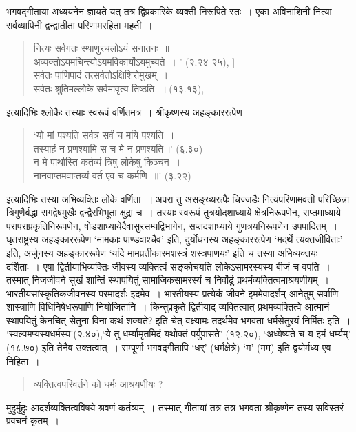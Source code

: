 {भगवद्गीताया अध्ययनेन ज्ञायते यत् तत्र द्विप्रकारिके व्यक्ती निरूपिते स्तः~। एका अविनाशिनी नित्या सर्वव्यापिनी द्वन्द्वातीता परिणामरहिता महती~। 
\begin{verse}
नित्यः सर्वगतः स्थाणुरचलोऽयं सनातनः~॥ \\
अव्यक्तोऽयमचिन्त्योऽयमविकार्योऽयमुच्यते~। ' (२.२४-२५), ]\\
सर्वतः पाणिपादं तत्सर्वतोऽक्षिशिरोमुखम्~। \\
सर्वतः श्रुतिमल्लोके सर्वमावृत्य तिष्ठति~॥ (१३.१३), 
\end{verse}
इत्यादिभिः श्लोकैः तस्याः स्वरूपं वर्णितमत्र~। श्रीकृष्णस्य अहङ्काररूपेण 
\begin{verse}
‘यो मां पश्यति सर्वत्र सर्वं च मयि पश्यति~। \\
तस्याहं न प्रणश्यामि स च मे न प्रणश्यति॥' (६.३०)\\
न मे पार्थास्ति कर्तव्यं त्रिषु लोकेषु किञ्चन~। \\
नानवाप्तमवाप्तव्यं वर्त एव च कर्मणि~॥' (३.२२) 
\end{verse}
इत्यादिभिः तस्या अभिव्यक्तिः लोके वर्णिता~॥ अपरा तु असङ्ख्यरूपैः चिज्जडैः नित्यं\break परिणामवती परिच्छिन्ना त्रिगुणैर्बद्धा रागद्वेषमुखैः द्वन्द्वैरभिभूता क्षुद्रा च~। तस्याः स्वरूपं तु\break त्रयोदशाध्याये क्षेत्रनिरूपणेन, सप्तमाध्याये परापराप्रकृतिनिरूपणेन, षोडशाध्याये\break दैवासुरसम्पद्विभागेन, सप्तदशाध्याये गुणत्रयनिरूपणेन उपपादितम्~। धृतराष्ट्रस्य अहङ्काररूपेण ‘मामकाः पाण्डवाश्चैव' इति, दुर्योधनस्य अहङ्काररूपेण ‘मदर्थे त्यक्तजीविताः' इति, अर्जुनस्य अहङ्काररूपेण ‘यदि मामप्रतीकारमशस्त्रं शस्त्रपाणयः' इति च तस्या अभिव्यक्तयः दर्शिताः~। एषा द्वितीयाभिव्यक्तिः जीवस्य व्यक्तित्वं सङ्कोचयति लोकेऽसामरस्यस्य बीजं च वपति~। तस्मात् निजजीवने सुखं शान्तिं स्थापयितुं सामाजिकसामरस्यं च निर्वोढुं प्रथमं\break व्यक्तित्वमाश्रयणीयम्~। भारतीयसांस्कृतिकजीवनस्य परमादर्शः इदमेव~। भारतीयस्य प्रत्येकं जीवने इममेवादर्शम् आनेतुम् सर्वाणि शास्त्राणि विधिनिषेधरूपाणि नियोजितानि~। किन्तु\break प्रकृते द्वितीयाद् व्यक्तित्वात् प्रथमव्यक्तित्वे आत्मानं स्थापयितुं केनचित् सेतुना विना कथं शक्यते? इति चेत् वक्ष्यामः तदर्थमेव भगवता धर्मसेतुरयं निर्मितः इति~। ‘स्वल्पमप्यस्य\break धर्मस्य'(२.४०),‘ये तु धर्म्यामृतमिदं यथोक्तं पर्युपासते' (१२.२०), ‘अध्येष्यते च य इमं धर्म्यम्' (१८.७०) इति तेनैव उक्तत्वात्~। सम्पूर्णा भगवद्गीतापि ‘धर्' (धर्मक्षेत्रे) ‘म' (मम) इति द्वयोर्मध्य एव निहिता~। 
\begin{verse}
व्यक्तित्वपरिवर्तने को धर्मः आश्रयणीयः ?
\end{verse}
मुहुर्मुहुः आदर्शव्यक्तित्वविषये श्रवणं कर्तव्यम्~। तस्मात् गीतायां तत्र तत्र भगवता श्रीकृष्णेन तस्य सविस्तरं प्रवचनं कृतम्~। 
}
